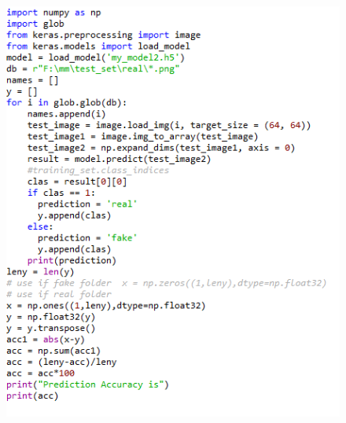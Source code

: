 \documentclass[a4paper,12pt,oneside]{article}
\begin{document}
\begin{figure}[H]
\centering
\includegraphics[height=20cm,width=15cm]{codetestall.PNG}
\end{figure}
\end{document}

